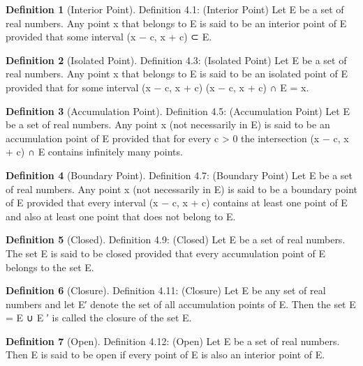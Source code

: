 \documentclass[11pt]{article}
\theoremstyle{definition}
\newtheorem{definition}{Definition}[section]
\begin{document}
\begin{definition} [Interior Point]
	Definition 4.1: (Interior Point) Let E be a set of real numbers. Any point x that belongs to E is said
	to be an interior point of E provided that some interval
	(x − c, x + c) ⊂ E.
\end{definition}

\setcounter{definition}{2}
\begin{definition} [Isolated Point]
	Definition 4.3: (Isolated Point) Let E be a set of real numbers. Any point x that belongs to E is said
	to be an isolated point of E provided that for some interval (x − c, x + c)
	(x − c, x + c) ∩ E = {x}.
\end{definition}

\setcounter{definition}{4}
\begin{definition} [Accumulation Point]
	Definition 4.5: (Accumulation Point) Let E be a set of real numbers. Any point x (not necessarily in
	E) is said to be an accumulation point of E provided that for every c > 0 the intersection
	(x − c, x + c) ∩ E
	contains infinitely many points.
\end{definition}

\setcounter{definition}{6}
\begin{definition} [Boundary Point]
	Definition 4.7: (Boundary Point) Let E be a set of real numbers. Any point x (not necessarily in E)
	is said to be a boundary point of E provided that every interval (x − c, x + c) contains at least one point of
	E and also at least one point that does not belong to E.
\end{definition}

\setcounter{definition}{8}
\begin{definition} [Closed]
	Definition 4.9: (Closed) Let E be a set of real numbers. The set E is said to be closed provided that
	every accumulation point of E belongs to the set E.
\end{definition}

\setcounter{definition}{10}
\begin{definition} [Closure]
	Definition 4.11: (Closure) Let E be any set of real numbers and let E′ denote the set of all accumulation
	points of E. Then the set
	E = E ∪ E
	′
	is called the closure of the set E.
\end{definition}


\begin{definition} [Open]
	Definition 4.12: (Open) Let E be a set of real numbers. Then E is said to be open if every point of E
	is also an interior point of E.
\end{definition}
\end{document}
